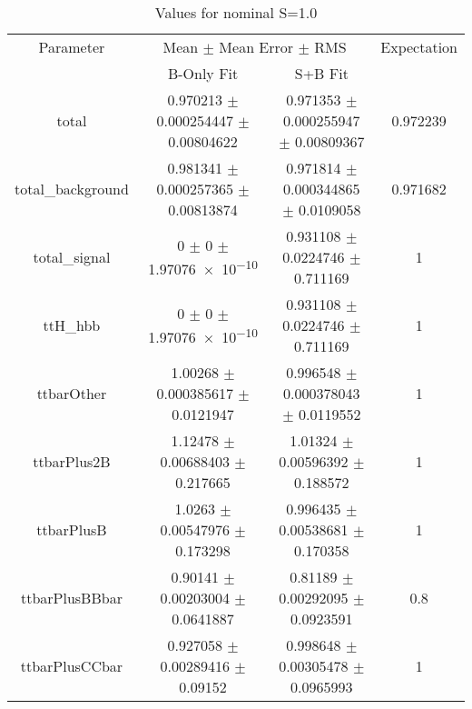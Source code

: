 \begin{table}
\centering
\caption{Values for nominal S=1.0}
\begin{tabular}{cccc}
\toprule
Parameter & \multicolumn{2}{c}{Mean $\pm$ Mean Error $\pm$ RMS} & Expectation\\
 & B-Only Fit & S+B Fit & \\
\midrule
total & \num{0.970213} $\pm$ \num{0.000254447} $\pm$ \num{0.00804622} & \num{0.971353} $\pm$ \num{0.000255947} $\pm$ \num{0.00809367} & \num{0.972239}\\
total\_background & \num{0.981341} $\pm$ \num{0.000257365} $\pm$ \num{0.00813874} & \num{0.971814} $\pm$ \num{0.000344865} $\pm$ \num{0.0109058} & \num{0.971682}\\
total\_signal & \num{0} $\pm$ \num{0} $\pm$ \num{1.97076e-10} & \num{0.931108} $\pm$ \num{0.0224746} $\pm$ \num{0.711169} & \num{1}\\
ttH\_hbb & \num{0} $\pm$ \num{0} $\pm$ \num{1.97076e-10} & \num{0.931108} $\pm$ \num{0.0224746} $\pm$ \num{0.711169} & \num{1}\\
ttbarOther & \num{1.00268} $\pm$ \num{0.000385617} $\pm$ \num{0.0121947} & \num{0.996548} $\pm$ \num{0.000378043} $\pm$ \num{0.0119552} & \num{1}\\
ttbarPlus2B & \num{1.12478} $\pm$ \num{0.00688403} $\pm$ \num{0.217665} & \num{1.01324} $\pm$ \num{0.00596392} $\pm$ \num{0.188572} & \num{1}\\
ttbarPlusB & \num{1.0263} $\pm$ \num{0.00547976} $\pm$ \num{0.173298} & \num{0.996435} $\pm$ \num{0.00538681} $\pm$ \num{0.170358} & \num{1}\\
ttbarPlusBBbar & \num{0.90141} $\pm$ \num{0.00203004} $\pm$ \num{0.0641887} & \num{0.81189} $\pm$ \num{0.00292095} $\pm$ \num{0.0923591} & \num{0.8}\\
ttbarPlusCCbar & \num{0.927058} $\pm$ \num{0.00289416} $\pm$ \num{0.09152} & \num{0.998648} $\pm$ \num{0.00305478} $\pm$ \num{0.0965993} & \num{1}\\
\bottomrule
\end{tabular}
\end{table}